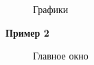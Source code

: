 \documentclass[14pt, a4paper]{extarticle}
\begin{document}
	\begin{figure}[h!]
		\centering\caption{Графики}
	\end{figure}
	\newpage
	
	\textbf{Пример 2}
	\begin{figure}[h!]
		\centering\caption{Главное окно}
	\end{figure}
	
\end{document}
